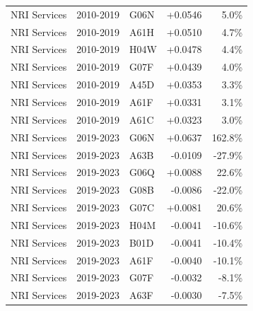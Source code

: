 \begin{tabular}{lllrr}
NRI Services & 2010-2019 & G06N & +0.0546 & 5.0\% \\
NRI Services & 2010-2019 & A61H & +0.0510 & 4.7\% \\
NRI Services & 2010-2019 & H04W & +0.0478 & 4.4\% \\
NRI Services & 2010-2019 & G07F & +0.0439 & 4.0\% \\
NRI Services & 2010-2019 & A45D & +0.0353 & 3.3\% \\
NRI Services & 2010-2019 & A61F & +0.0331 & 3.1\% \\
NRI Services & 2010-2019 & A61C & +0.0323 & 3.0\% \\
NRI Services & 2019-2023 & G06N & +0.0637 & 162.8\% \\
NRI Services & 2019-2023 & A63B & -0.0109 & -27.9\% \\
NRI Services & 2019-2023 & G06Q & +0.0088 & 22.6\% \\
NRI Services & 2019-2023 & G08B & -0.0086 & -22.0\% \\
NRI Services & 2019-2023 & G07C & +0.0081 & 20.6\% \\
NRI Services & 2019-2023 & H04M & -0.0041 & -10.6\% \\
NRI Services & 2019-2023 & B01D & -0.0041 & -10.4\% \\
NRI Services & 2019-2023 & A61F & -0.0040 & -10.1\% \\
NRI Services & 2019-2023 & G07F & -0.0032 & -8.1\% \\
NRI Services & 2019-2023 & A63F & -0.0030 & -7.5\% \\
\bottomrule
\end{tabular}
